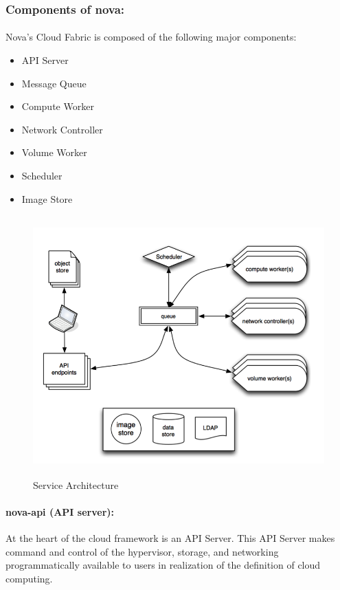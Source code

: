 \subsubsection{Components of nova:}
\paragraph{}
Nova’s Cloud Fabric is composed of the following major components:
\begin{itemize}
 \item API Server
 \item Message Queue
 \item Compute Worker
 \item Network Controller
 \item Volume Worker
 \item Scheduler
 \item Image Store
\end{itemize}

\begin{figure}[!h]
 \center
 \includegraphics[width=12cm, height=10cm]{./images/components.png}
 \caption{Service Architecture}
\end{figure}



\paragraph{nova-api (API server):}At the heart of the cloud framework is an API Server. This API Server makes command and control of the hypervisor,
 storage, and networking programmatically available to users in realization of the definition of cloud computing.
